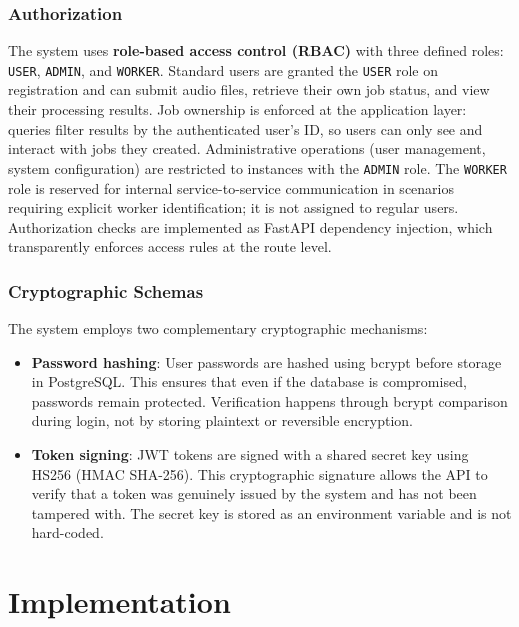 \documentclass{scrartcl}
\begin{document}
\subsubsection*{Authorization}

The system uses \textbf{role-based access control (RBAC)} with three defined roles: \texttt{USER}, \texttt{ADMIN}, and \texttt{WORKER}.
Standard users are granted the \texttt{USER} role on registration and can submit audio files, retrieve their own job status, and view their processing results.
Job ownership is enforced at the application layer: queries filter results by the authenticated user's ID, so users can only see and interact with jobs they created.
Administrative operations (user management, system configuration) are restricted to instances with the \texttt{ADMIN} role.
The \texttt{WORKER} role is reserved for internal service-to-service communication in scenarios requiring explicit worker identification; it is not assigned to regular users.
Authorization checks are implemented as FastAPI dependency injection, which transparently enforces access rules at the route level.

\subsubsection*{Cryptographic Schemas}

The system employs two complementary cryptographic mechanisms:
\begin{itemize}
  \item \textbf{Password hashing}: User passwords are hashed using bcrypt before storage in PostgreSQL. This ensures that even if the database is compromised, passwords remain protected. Verification happens through bcrypt comparison during login, not by storing plaintext or reversible encryption.
  \item \textbf{Token signing}: JWT tokens are signed with a shared secret key using HS256 (HMAC SHA-256). This cryptographic signature allows the API to verify that a token was genuinely issued by the system and has not been tampered with. The secret key is stored as an environment variable and is not hard-coded.
\end{itemize}

\section{Implementation}\label{implementation}

\end{document}
